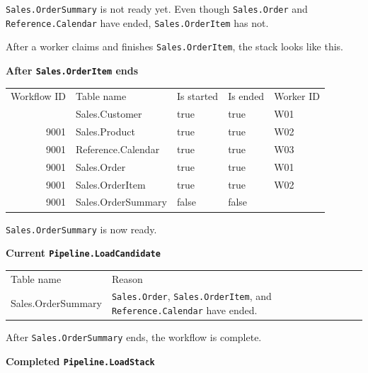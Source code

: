 \documentclass[10pt,openany,10pt]{book}
\newcounter{none}
\let\podeToprule\toprule
\let\podeMidrule\midrule
\let\podeBottomrule\bottomrule
\renewcommand{\toprule}{\arrayrulecolor{pbiGrid}\podeToprule}
\renewcommand{\midrule}{\arrayrulecolor{pbiGrid}\podeMidrule}
\renewcommand{\bottomrule}{\arrayrulecolor{pbiGrid}\podeBottomrule}
\begin{document}
\texttt{Sales.OrderSummary} is not ready yet. Even though
\texttt{Sales.Order} and \texttt{Reference.Calendar} have ended,
\texttt{Sales.OrderItem} has not.

After a worker claims and finishes \texttt{Sales.OrderItem}, the stack
looks like this.

\textbf{After \texttt{Sales.OrderItem} ends}

{\def\LTcaptype{none} %
\begin{longtable}[]{@{}rllll@{}}
\toprule\noalign{}
Workflow ID & Table name & Is started & Is ended & Worker ID \\
\midrule\noalign{}
\endhead
\bottomrule\noalign{}
\endlastfoot
9001 & Sales.Customer & true & true & W01 \\
9001 & Sales.Product & true & true & W02 \\
9001 & Reference.Calendar & true & true & W03 \\
9001 & Sales.Order & true & true & W01 \\
9001 & Sales.OrderItem & true & true & W02 \\
9001 & Sales.OrderSummary & false & false & \\
\end{longtable}
}

\texttt{Sales.OrderSummary} is now ready.

\textbf{Current \texttt{Pipeline.LoadCandidate}}

{\def\LTcaptype{none} %
\begin{longtable}[]{@{}
  >{\raggedright\arraybackslash}p{}
  >{\raggedright\arraybackslash}p{}@{}}
\toprule\noalign{}
\begin{minipage}[b]{\linewidth}\raggedright
Table name
\end{minipage} & \begin{minipage}[b]{\linewidth}\raggedright
Reason
\end{minipage} \\
\midrule\noalign{}
\endhead
\bottomrule\noalign{}
\endlastfoot
Sales.OrderSummary & \texttt{Sales.Order}, \texttt{Sales.OrderItem}, and
\texttt{Reference.Calendar} have ended. \\
\end{longtable}
}

After \texttt{Sales.OrderSummary} ends, the workflow is complete.

\textbf{Completed \texttt{Pipeline.LoadStack}}
\end{document}
